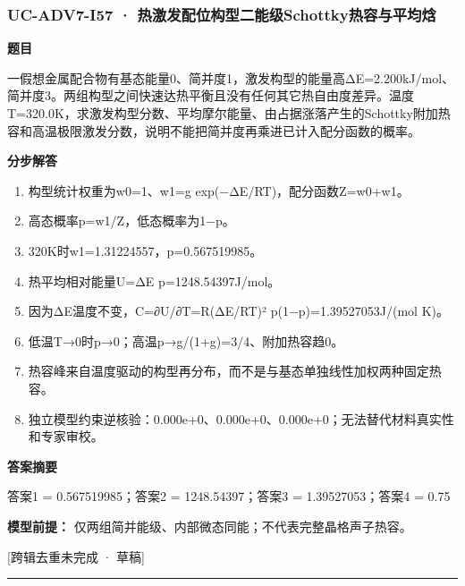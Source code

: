 \documentclass[UTF8,11pt,a4paper]{ctexart}
\begin{document}
\subsubsection*{UC-ADV7-I57 · 热激发配位构型二能级Schottky热容与平均焓}
\noindent\textbf{题目}\par
一假想金属配合物有基态能量0、简并度1，激发构型的能量高ΔE=2.200kJ/mol、简并度3。两组构型之间快速达热平衡且没有任何其它热自由度差异。温度T=320.0K，求激发构型分数、平均摩尔能量、由占据涨落产生的Schottky附加热容和高温极限激发分数，说明不能把简并度再乘进已计入配分函数的概率。\par
\medskip\noindent\textbf{分步解答}
\begin{enumerate}
\item 构型统计权重为w0=1、w1=g exp(−ΔE/RT)，配分函数Z=w0+w1。
\item 高态概率p=w1/Z，低态概率为1−p。
\item 320K时w1=1.31224557，p=0.567519985。
\item 热平均相对能量U=ΔE p=1248.54397J/mol。
\item 因为ΔE温度不变，C=∂U/∂T=R(ΔE/RT)² p(1−p)=1.39527053J/(mol K)。
\item 低温T→0时p→0；高温p→g/(1+g)=3/4、附加热容趋0。
\item 热容峰来自温度驱动的构型再分布，而不是与基态单独线性加权两种固定热容。
\item 独立模型约束逆核验：0.000e+0、0.000e+0、0.000e+0；无法替代材料真实性和专家审校。
\end{enumerate}
\noindent\textbf{答案摘要}\par
答案1 = 0.567519985；答案2 = 1248.54397；答案3 = 1.39527053；答案4 = 0.75\par
\noindent\textbf{模型前提：}
仅两组简并能级、内部微态同能；不代表完整晶格声子热容。\par
\noindent\textcolor{red!65!black}{[跨辑去重未完成 · 草稿]} \par
\medskip\hrule\medskip
{}
\end{document}
